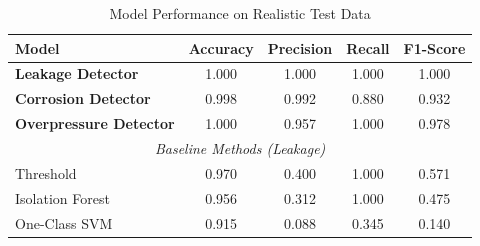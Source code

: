\begin{table}[h]
\centering
\caption{Model Performance on Realistic Test Data}
\begin{tabular}{lcccc}
\hline
Model & Accuracy & Precision & Recall & F1-Score \\
\hline
\textbf{Leakage Detector} & 1.000 & 1.000 & 1.000 & 1.000 \\
\textbf{Corrosion Detector} & 0.998 & 0.992 & 0.880 & 0.932 \\
\textbf{Overpressure Detector} & 1.000 & 0.957 & 1.000 & 0.978 \\
\hline
\multicolumn{5}{c}{\textit{Baseline Methods (Leakage)}} \\
\hline
Threshold & 0.970 & 0.400 & 1.000 & 0.571 \\
Isolation Forest & 0.956 & 0.312 & 1.000 & 0.475 \\
One-Class SVM & 0.915 & 0.088 & 0.345 & 0.140 \\
\hline
\end{tabular}
\label{tab:performance}
\end{table}
